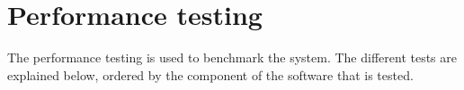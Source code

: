









\section{Performance testing}
	The performance testing is used to benchmark the system.
	The different tests are explained below, ordered by the component of the software that is tested. 
	\\[0.5cm]

